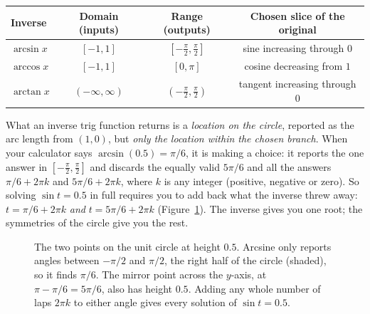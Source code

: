 \begin{center}
\begin{tabular}{lccc}
\toprule
Inverse & Domain (inputs) & Range (outputs) & Chosen slice of the original \\
\midrule
$\arcsin x$ & $[-1,1]$ & $[-\tfrac\pi2,\tfrac\pi2]$ & sine increasing through $0$ \\
$\arccos x$ & $[-1,1]$ & $[0,\pi]$ & cosine decreasing from $1$ \\
$\arctan x$ & $(-\infty,\infty)$ & $(-\tfrac\pi2,\tfrac\pi2)$ & tangent increasing through $0$ \\
\bottomrule
\end{tabular}
\end{center}

\begin{happeningbox}
What an inverse trig function returns is a \emph{location on the circle}, reported as the arc length from $(1,0)$, but \emph{only the location within the chosen branch}. When your calculator says $\arcsin(0.5) = \pi/6$, it is making a choice: it reports the one answer in $[-\tfrac\pi2,\tfrac\pi2]$ and discards the equally valid $5\pi/6$ and all the answers $\pi/6 + 2\pi k$ and $5\pi/6 + 2\pi k$, where $k$ is any integer (positive, negative or zero). So solving $\sin t = 0.5$ in full requires you to add back what the inverse threw away: $t = \pi/6 + 2\pi k$ \emph{and} $t = 5\pi/6 + 2\pi k$ (Figure~\ref{ch04:fig-two-solutions}). The inverse gives you one root; the symmetries of the circle give you the rest.
\end{happeningbox}

\begin{figure}[htbp]
\centering
{}
\caption{The two points on the unit circle at height $0.5$. Arcsine only reports angles between $-\pi/2$ and $\pi/2$, the right half of the circle (shaded), so it finds $\pi/6$. The mirror point across the $y$-axis, at $\pi - \pi/6 = 5\pi/6$, also has height $0.5$. Adding any whole number of laps $2\pi k$ to either angle gives every solution of $\sin t = 0.5$.}
\label{ch04:fig-two-solutions}
\end{figure}

